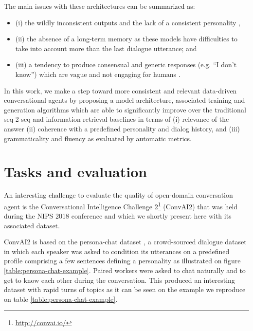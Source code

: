 \documentclass[letterpaper]{article} \usepackage{aaai19}  \usepackage{times}  \usepackage{helvet}  \usepackage{courier}  \usepackage{url}  \usepackage{graphicx}  \usepackage{natbib}
\begin{document}
The main issues with these architectures can be summarized as:
\begin{itemize}
\item (i) the wildly inconsistent outputs and the lack of a consistent personality \citep{li_neural_2016},
\item (ii) the absence of a long-term memory as these models have difficulties to take into account more than the last dialogue utterance; and 
\item (iii) a tendency to produce consensual and generic responses (e.g. “I don’t know”) which are vague and not engaging for humans \citep{li_simple_2016}.
\end{itemize}

In this work, we make a step toward more consistent and relevant data-driven conversational agents by proposing a model architecture, associated training and generation algorithms which are able to significantly improve over the traditional seq-2-seq and information-retrieval baselines in terms of (i) relevance of the answer (ii) coherence with a predefined personality and dialog history, and (iii) grammaticality and fluency as evaluated by automatic metrics.

\section{Tasks and evaluation}

An interesting challenge to evaluate the quality of open-domain conversation agent is the Conversational Intelligence Challenge 2\footnote{\url{http://convai.io/}} (ConvAI2) that was held during the NIPS 2018 conference and which we shortly present here with its associated dataset.

ConvAI2 is based on the {\sc persona-chat} dataset \citep{zhang_personalizing_2018}, a crowd-sourced dialogue dataset in which each speaker was asked to condition its utterances on a predefined profile comprising a few sentences defining a personality as illustrated on figure \ref{table:persona-chat-example}. Paired workers were asked to chat naturally and to get to know each other during the conversation. This produced an interesting dataset with rapid turns of topics as it can be seen on the example we reproduce on table \ref{table:persona-chat-example}.
\end{document}
